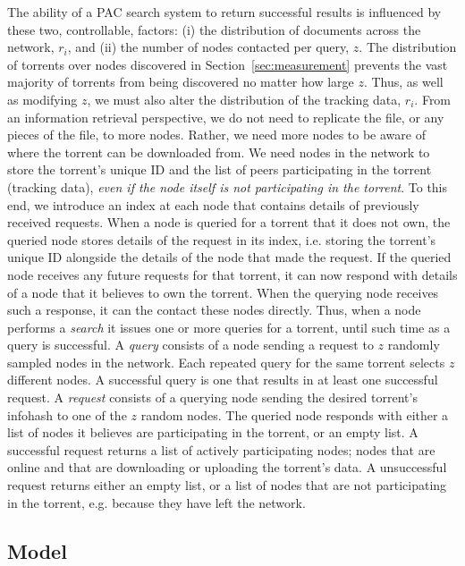    The ability of a PAC search system to return successful results is influenced by these two, controllable, factors: (i) the distribution of documents across the network, $r_i$, and (ii) the number of nodes contacted per query, $z$. The distribution of torrents over nodes discovered in Section~\ref{sec:measurement} prevents the vast majority of torrents from being discovered no matter how large $z$. Thus, as well as modifying $z$, we must also alter the distribution of the tracking data, $r_i$. From an information retrieval perspective, we do not need to replicate the file, or any pieces of the file, to more nodes. Rather, we need more nodes to be aware of where the torrent can be downloaded from. We need nodes in the network to store the torrent's unique ID and the list of peers participating in the torrent (tracking data), {\em even if the node itself is not participating in the torrent}. To this end, we introduce an index at each node that contains details of previously received requests. When a node is queried for a torrent that it does not own, the queried node stores details of the request in its index, i.e. storing the torrent's unique ID alongside the details of the node that made the request. If the queried node receives any future requests for that torrent, it can now respond with details of a node that it believes to own the torrent. When the querying node receives such a response, it can the contact these nodes directly. Thus, when a node performs a {\em search} it issues one or more queries for a torrent, until such time as a query is successful. A {\em query} consists of a node sending a request to $z$ randomly sampled nodes in the network. Each repeated query for the same torrent selects $z$ different nodes. A successful query is one that results in at least one successful request. A {\em request} consists of a querying node sending the desired torrent's infohash to one of the $z$ random nodes. The queried node responds with either a list of nodes it believes are participating in the torrent, or an empty list. A successful request returns a list of actively participating nodes; nodes that are online and that are downloading or uploading the torrent's data. A unsuccessful request returns either an empty list, or a list of nodes that are not participating in the torrent, e.g. because they have left the network.

\subsection{Model}\label{sec:extension:model}

